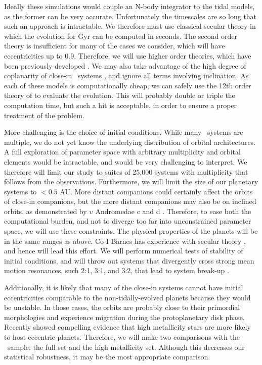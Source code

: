 Ideally these simulations would couple an N-body integrator to the
tidal models, as the former can be very accurate. Unfortunately the
timescales are so long that such an approach is intractable. We
therefore must use classical secular theory in which the evolution for
Gyr can be computed in seconds. The second order theory is
insufficient for many of the cases we consider, which will have
eccentricities up to 0.9. Therefore, we will use higher order
theories, which have been previously developed
\citep[e.g.][]{Ford01,VerasArmitage04,LibertHenrard06}. We may also
take advantage of the high degree of coplanarity of close-in
\kepler~systems \cite{Fabrycky10}, and ignore all terms involving
inclination. As each of these models is computationally cheap, we can
safely use the 12th order theory of \cite{LibertHenrard} to evaluate
the evolution. This will probably double or triple the computation
time, but such a hit is acceptable, in order to ensure a proper
treatment of the problem.

More challenging is the choice of initial conditions. While many
\kepler~systems are multiple, we do not yet know the underlying
distribution of orbital architectures. A full exploration of parameter
space with arbitrary multiplicity and orbital elements would be
intractable, and would be very challenging to interpret. We therefore
will limit our study to suites of 25,000 systems with multiplicity
that follows from the observations. Furthermore, we will limit the
size of our planetary systems to $<0.5$ AU. More distant companions
could certainly affect the orbits of close-in companions, but the more
distant companions may also be on inclined orbits, as demonstrated by
$\upsilon$ Andromedae c and d
\citep{McArthur10,ReffertQuirrenbach11}. Therefore, to ease both the
computational burden, and not to diverge too far into unconstrained
parameter space, we will use these constraints. The physical
properties of the planets will be in the same ranges as above. Co-I
Barnes has experience with secular theory
\citep{BarnesGreenberg06a,BarnesGreenberg06b}, and hence will lead
this effort. We will perform numerical tests of stability of initial
conditions, and will throw out systems that divergently cross strong
mean motion resonances, such 2:1, 3:1, and 3:2, that lead to system
break-up \citep[e.g.][]{Gomes05}.

Additionally, it is likely that many of the close-in systems cannot
have initial eccentricities comparable to the non-tidally-evolved
planets because they would be unstable. In those cases, the orbits are
probably close to their primordial morphologies and experience
migration during the protoplanetary disk phase. Recently
\cite{DawsonMurrayClay13} showed compelling evidence that high
metallicity stars are more likely to host eccentric
planets. Therefore, we will make two comparisons with the
\kepler~sample: the full set and the high metallicity set. Although
this decreases our statistical robustness, it may be the most
appropriate comparison.

